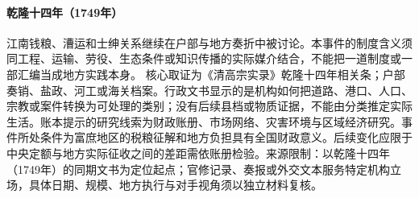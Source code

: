 \hypertarget{civic:EQ-1749-JIANGNAN-TAX-REVIEW}{}\paragraph{乾隆十四年（1749年）}江南钱粮、漕运和士绅关系继续在户部与地方奏折中被讨论。本事件的制度含义须同工程、运输、劳役、生态条件或知识传播的实际媒介结合，不能把一道制度或一部汇编当成地方实践本身。 核心取证为《清高宗实录》乾隆十四年相关条；户部奏销、盐政、河工或海关档案。行政文书显示的是机构如何把道路、港口、人口、宗教或案件转换为可处理的类别；没有后续县档或物质证据，不能由分类推定实际生活。账本提示的研究线索为财政账册、市场网络、灾害环境与区域经济研究。事件所处条件为富庶地区的税粮征解和地方负担具有全国财政意义。后续变化应限于中央定额与地方实际征收之间的差距需依账册检验。来源限制：以乾隆十四年（1749年）的同期文书为定位起点；官修记录、奏报或外交文本服务特定机构立场，具体日期、规模、地方执行与对手视角须以独立材料复核。
